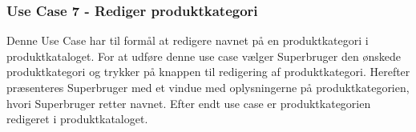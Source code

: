 \subsubsection{Use Case 7 - Rediger produktkategori}
Denne Use Case har til formål at redigere navnet på en produktkategori i produktkataloget. For at udføre denne use case vælger Superbruger den ønskede produktkategori og trykker på knappen til redigering af produktkategori. Herefter præsenteres Superbruger med et vindue med oplysningerne på produktkategorien, hvori Superbruger retter navnet. Efter endt use case er produktkategorien redigeret i produktkataloget.
